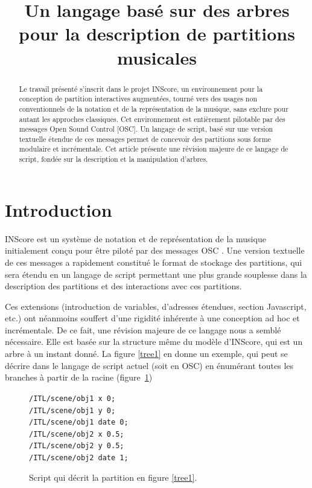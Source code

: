\documentclass{article}
\title{Un langage basé sur des arbres pour la description de partitions musicales}
\newcommand{\IS}		{INScore}
\newcommand{\code}	[2][0.9]		{\vspace{0mm}\begin{center}\colorbox{mygrey}{
							\begin{minipage}[t]{#1\columnwidth} 
							{\small \texttt{#2}}
							\end{minipage}}\end{center}}
\begin{document}
%
\maketitle
%
\begin{abstract}
Le travail présenté s'inscrit dans le projet \IS, un environnement pour la conception de partition interactives augmentées, tourné vers des usages non conventionnels de la notation et de la représentation de la musique, sans exclure pour autant les approches classiques. Cet environnement est entièrement pilotable par des messages Open Sound Control [OSC]. Un langage de script, basé sur une version textuelle étendue de ces messages permet de concevoir des partitions sous forme modulaire et incrémentale. Cet article présente une révision majeure de ce langage de script, fondée sur la description et la manipulation d'arbres.
\end{abstract}

\section{Introduction}\label{sec:introduction}

\IS \cite{Fober:12a} est un système de notation et de représentation de la musique initialement conçu pour être piloté par des messages OSC \cite{OSC}. Une version textuelle de ces messages a rapidement constitué le format de stockage des partitions, qui sera étendu en un langage de script \cite{Fober:13b} permettant une plus grande souplesse dans la description des partitions et des interactions avec ces partitions.

Ces extensions (introduction de variables, d'adresses étendues, section Javascript, etc.) ont néanmoins souffert d'une rigidité inhérente à une conception ad hoc et incrémentale. De ce fait, une révision majeure de ce langage nous a semblé nécessaire. Elle est basée sur la structure même du modèle d'\IS, qui est un arbre à un instant donné. 
La figure \ref{tree1} en donne un exemple, qui peut se décrire dans le langage de script actuel (soit en OSC) en énumérant toutes les branches à partir de la racine (figure~\ref{script1})
\begin{figure}[htbp]
\code{/ITL/scene/obj1 x 0;\\
/ITL/scene/obj1 y    0;\\
/ITL/scene/obj1 date 0;\\
/ITL/scene/obj2 x    0.5;\\
/ITL/scene/obj2 y    0.5;\\
/ITL/scene/obj2 date 1;
}
\caption{Script qui décrit la partition en figure \ref{tree1}.}
\label{script1}
\end{figure}
\end{document}
